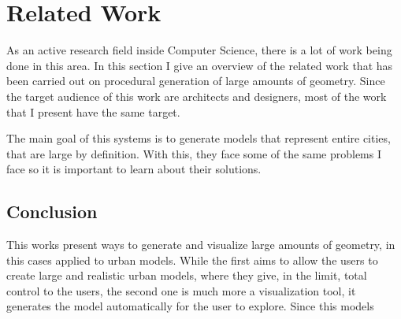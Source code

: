 
% 
% 

\section{Related Work}
\label{sec:related_work}

As an active research field inside Computer Science, there is a lot of work being done in this area. In this section I give an overview of the related work that has been carried out on procedural generation of large amounts of geometry. Since the target audience of this work are architects and designers, most of the work that I present have the same target.

The main goal of this systems is to generate models that represent entire cities, that are large by definition. With this, they face some of the same problems I face so it is important to learn about their solutions.






\subsection{Conclusion} %
\label{sub:conclusion}

This works present ways to generate and visualize large amounts of geometry, in this cases applied to urban models. While the first \cite{Parish2001} aims to allow the users to create large and realistic urban models, where they give, in the limit, total control to the users, the second one\cite{Greuter2003} is much more a visualization tool, it generates the model automatically for the user to explore. Since this models 


